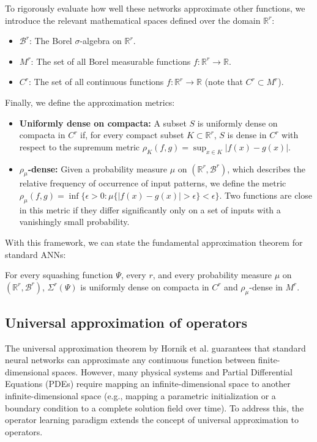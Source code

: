 To rigorously evaluate how well these networks approximate other functions, we introduce the relevant mathematical spaces defined over the domain $\mathbb{R}^r$:
\begin{itemize}
    \item $\mathcal{B}^r$: The Borel $\sigma$-algebra on $\mathbb{R}^r$.
    \item $M^r$: The set of all Borel measurable functions $f: \mathbb{R}^r \to \mathbb{R}$.
    \item $C^r$: The set of all continuous functions $f: \mathbb{R}^r \to \mathbb{R}$ (note that $C^r \subset M^r$).
\end{itemize}

Finally, we define the approximation metrics:
\begin{itemize}
    \item \textbf{Uniformly dense on compacta:} A subset $S$ is uniformly dense on compacta in $C^r$ if, for every compact subset $K \subset \mathbb{R}^r$, $S$ is dense in $C^r$ with respect to the supremum metric $\rho_K(f, g) = \sup_{x \in K} |f(x) - g(x)|$.
    \item \textbf{$\rho_\mu$-dense:} Given a probability measure $\mu$ on $(\mathbb{R}^r, \mathcal{B}^r)$, which describes the relative frequency of occurrence of input patterns, we define the metric $\rho_\mu(f, g) = \inf\{\epsilon > 0 : \mu\{|f(x) - g(x)| > \epsilon\} < \epsilon\}$. Two functions are close in this metric if they differ significantly only on a set of inputs with a vanishingly small probability.
\end{itemize}

With this framework, we can state the fundamental approximation theorem for standard ANNs:

\begin{theorem}
For every squashing function $\Psi$, every $r$, and every probability measure $\mu$ on $(\mathbb{R}^r, \mathcal{B}^r)$, $\Sigma^r(\Psi)$ is uniformly dense on compacta in $C^r$ and $\rho_\mu$-dense in $M^r$.
\end{theorem}


\subsection{Universal approximation of operators}

The universal approximation theorem by Hornik et al. guarantees that standard neural networks can approximate any continuous function between finite-dimensional spaces. However, many physical systems and Partial Differential Equations (PDEs) require mapping an infinite-dimensional space to another infinite-dimensional space (e.g., mapping a parametric initialization or a boundary condition to a complete solution field over time). To address this, the operator learning paradigm extends the concept of universal approximation to operators.

